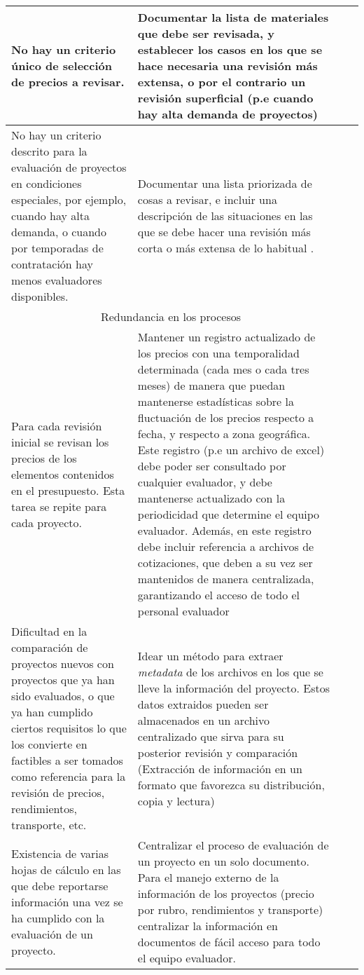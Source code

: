 \documentclass{article}
\begin{document}
\begin{landscape}
\begin{longtable}{ |p{12cm}|p{8cm}|p{2cm}|p{2cm}|}
No hay un criterio único de selección de precios a revisar. & Documentar la lista de materiales que debe ser revisada, y establecer los casos en los que se hace necesaria una revisión más extensa, o por el contrario un revisión superficial (p.e cuando hay alta demanda de proyectos)& & \\\hline

No hay un criterio descrito para la evaluación de proyectos en condiciones especiales, por ejemplo, cuando hay alta demanda, o cuando por temporadas de contratación hay menos evaluadores disponibles. & Documentar una lista priorizada de cosas a revisar, e incluir una descripción de las situaciones en las que se debe hacer una revisión más corta o más extensa de lo habitual .& & \\\hline

\multicolumn{2}{|c|}{Redundancia en los procesos} & & \\\hline
Para cada revisión inicial se revisan los precios de los elementos contenidos en el presupuesto. Esta tarea se repite para cada proyecto. & Mantener un registro actualizado de los precios con una temporalidad determinada (cada mes o cada tres meses) de manera que puedan mantenerse estadísticas sobre la fluctuación de los precios respecto a fecha, y respecto a zona geográfica. Este registro (p.e un archivo de excel) debe poder ser consultado por cualquier evaluador, y debe mantenerse actualizado con la periodicidad que determine el equipo evaluador. Además, en este registro debe incluir referencia a archivos de cotizaciones, que deben a su vez ser mantenidos de manera centralizada, garantizando el acceso de todo el personal evaluador & & \\\hline

Dificultad en la comparación de proyectos nuevos con proyectos que ya han sido evaluados, o que ya han cumplido ciertos requisitos lo que los convierte en factibles a ser tomados como referencia para la revisión de precios, rendimientos, transporte, etc. & Idear un método para extraer \emph{metadata} de los archivos en los que se lleve la información del proyecto. Estos datos extraidos pueden ser almacenados en un archivo centralizado que sirva para su posterior revisión y comparación (Extracción de información en un formato que favorezca su distribución, copia y lectura) & & \\\hline

Existencia de varias hojas de cálculo en las que debe reportarse información una vez se ha cumplido con la evaluación de un proyecto.  & Centralizar el proceso de evaluación de un proyecto en un solo documento. Para el manejo externo de la información de los proyectos (precio por rubro, rendimientos y transporte) centralizar la información en documentos de fácil acceso para todo el equipo evaluador. & & \\\hline


\end{longtable}
\end{landscape}
\end{document}
